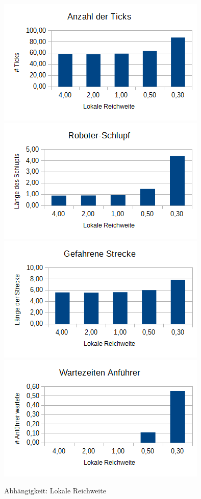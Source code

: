 \begin{figure}[h]
	\includegraphics[width=\sectionTransportPictureWidth , height=\sectionTransportPictureHeight]{graphics/Statistics/Transport/Range_Observations.png}
	\includegraphics[width=\sectionTransportPictureWidth , height=\sectionTransportPictureHeight]{graphics/Statistics/Transport/Range_Slack.png}
	\includegraphics[width=\sectionTransportPictureWidth , height=\sectionTransportPictureHeight]{graphics/Statistics/Transport/Range_Way.png}
	\includegraphics[width=\sectionTransportPictureWidth , height=\sectionTransportPictureHeight]{graphics/Statistics/Transport/Range_Move.png}
	\caption{Abhängigkeit: Lokale Reichweite}
	\label{pic:TransportRange}
\end{figure}

